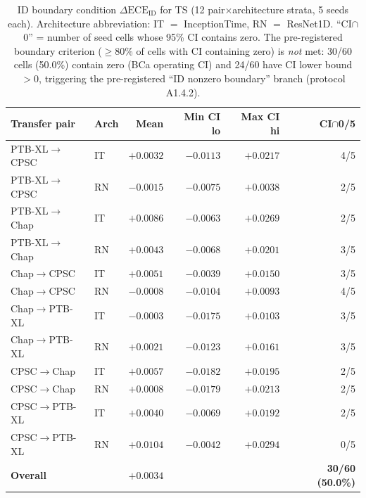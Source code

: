 \documentclass[review,12pt,nonatbib]{elsarticle}
\begin{document}
\begin{table}[t]
\centering
\caption{ID boundary condition $\Delta\text{ECE}_{\text{ID}}$ for TS
(12 pair$\times$architecture strata, 5 seeds each). Architecture
abbreviation: IT $=$ InceptionTime, RN $=$ ResNet1D. ``CI$\cap$0'' =
number of seed cells whose 95\% CI contains zero. The pre-registered
boundary criterion ($\geq$80\% of cells with CI containing zero) is
\emph{not} met: 30/60 cells (50.0\%) contain zero (BCa operating CI)
and 24/60 have CI lower bound $>0$, triggering the pre-registered
``ID nonzero boundary'' branch (protocol A1.4.2).}
\label{tab:boundary}
\footnotesize
\begin{tabular}{llrrrr}
\toprule
Transfer pair & Arch & Mean & Min CI lo & Max CI hi & CI$\cap$0/5 \\
\midrule
PTB-XL$\rightarrow$CPSC   & IT & $+0.0032$ & $-0.0113$ & $+0.0217$ & 4/5 \\
PTB-XL$\rightarrow$CPSC   & RN & $-0.0015$ & $-0.0075$ & $+0.0038$ & 2/5 \\
PTB-XL$\rightarrow$Chap   & IT & $+0.0086$ & $-0.0063$ & $+0.0269$ & 2/5 \\
PTB-XL$\rightarrow$Chap   & RN & $+0.0043$ & $-0.0068$ & $+0.0201$ & 3/5 \\
Chap$\rightarrow$CPSC     & IT & $+0.0051$ & $-0.0039$ & $+0.0150$ & 3/5 \\
Chap$\rightarrow$CPSC     & RN & $-0.0008$ & $-0.0104$ & $+0.0093$ & 4/5 \\
Chap$\rightarrow$PTB-XL   & IT & $-0.0003$ & $-0.0175$ & $+0.0103$ & 3/5 \\
Chap$\rightarrow$PTB-XL   & RN & $+0.0021$ & $-0.0123$ & $+0.0161$ & 3/5 \\
CPSC$\rightarrow$Chap     & IT & $+0.0057$ & $-0.0182$ & $+0.0195$ & 2/5 \\
CPSC$\rightarrow$Chap     & RN & $+0.0008$ & $-0.0179$ & $+0.0213$ & 2/5 \\
CPSC$\rightarrow$PTB-XL   & IT & $+0.0040$ & $-0.0069$ & $+0.0192$ & 2/5 \\
CPSC$\rightarrow$PTB-XL   & RN & $+0.0104$ & $-0.0042$ & $+0.0294$ & 0/5 \\
\midrule
\textbf{Overall} & & $\mathbf{+0.0034}$ & & & \textbf{30/60 (50.0\%)} \\
\bottomrule
\end{tabular}
\end{table}
\end{document}
